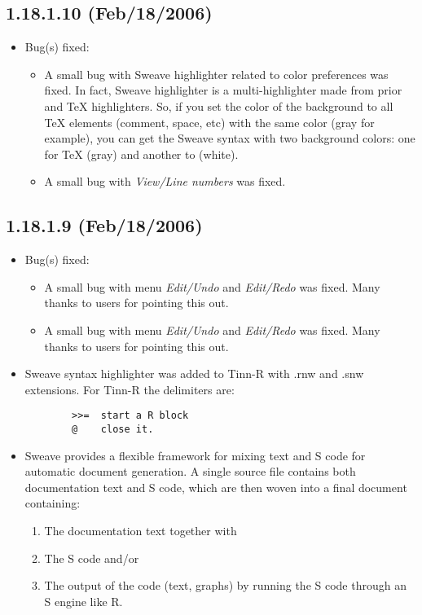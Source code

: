 \subsection*{1.18.1.10 (Feb/18/2006)}
\begin{itemize}
  \item Bug(s) fixed:
    \begin{itemize}
      \item A small bug with Sweave highlighter related to color preferences
        was fixed. In fact, Sweave highlighter is a multi-highlighter made
        from prior \RR{} and TeX highlighters. So, if you set the color
        of the background to all TeX elements (comment, space, etc) with
        the same color (gray for example), you can get the Sweave syntax with
        two background colors: one for TeX (gray) and another to \RR{} (white).
      \item A small bug with \textit{View/Line numbers} was fixed.
    \end{itemize}
\end{itemize}


\subsection*{1.18.1.9 (Feb/18/2006)}
\begin{itemize}
  \item Bug(s) fixed:
    \begin{itemize}
      \item A small bug with menu \textit{Edit/Undo} and \textit{Edit/Redo}
        was fixed. Many thanks to users for pointing this out.
      \item A small bug with menu \textit{Edit/Undo} and \textit{Edit/Redo}
        was fixed. Many thanks to users for pointing this out.
    \end{itemize}
  \item Sweave syntax highlighter was added to Tinn-R with .rnw and .snw
    extensions. For Tinn-R the delimiters are:

    \begin{footnotesize}
      \begin{verbatim}
        >>=  start a R block
        @    close it.
      \end{verbatim}
    \end{footnotesize}

  \item Sweave provides a flexible framework for mixing text and S code
    for automatic document generation. A single source file contains both
    documentation text and S code, which are then woven into a final
    document containing:
    \begin{enumerate}
      \item The documentation text together with
      \item The S code and/or
      \item The output of the code (text, graphs) by running the S code
        through an S engine like R.
    \end{enumerate}
\end{itemize}

